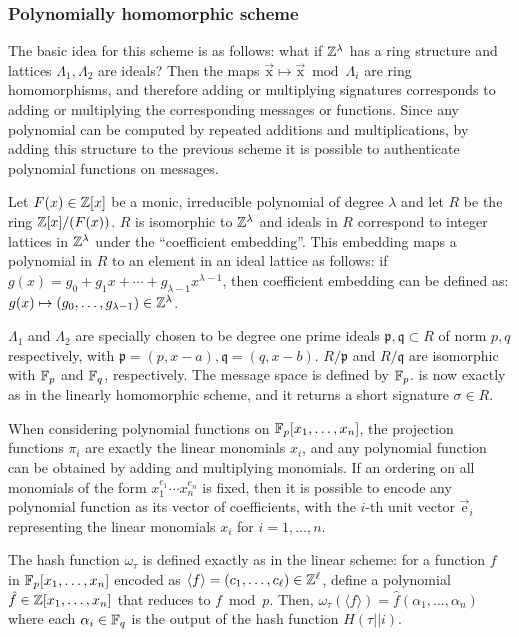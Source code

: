 \subsubsection*{Polynomially homomorphic scheme}
The basic idea for this scheme is as follows: what if $\mathbb{Z}^\lambda$ has a ring
structure and lattices $\Lambda_1, \Lambda_2$ are ideals? Then the maps
$\vec{\mathrm{x}} \mapsto \vec{\mathrm{x}} \bmod{\Lambda_i}$ are ring
homomorphisms, and therefore adding or multiplying signatures corresponds to
adding or multiplying the corresponding messages or functions. Since any
polynomial can be computed by repeated additions and multiplications, by adding
this structure to the previous scheme it is possible to authenticate polynomial
functions on messages.

Let $F(x) \in \mathbb{Z}[x]$ be a monic, irreducible polynomial of degree $\lambda$
and let $R$ be the ring $\mathbb{Z}[x]/(F(x))$. $R$ is isomorphic to $\mathbb{Z}^\lambda$
and ideals in $R$ correspond to integer lattices in $\mathbb{Z}^\lambda$ under the
``coefficient embedding''. This embedding maps a polynomial in $R$ to an
element in an ideal lattice as follows: if $g(x) = g_0 + g_1 x + \cdots
+ g_{\lambda-1} x^{\lambda - 1}$, then coefficient embedding can be defined as:
$g(x) \mapsto (g_0, \dotsc, g_{\lambda-1}) \in \mathbb{Z}^\lambda$.

$\Lambda_1$ and $\Lambda_2$ are specially chosen to be degree one prime ideals
$\mathfrak{p,q} \subset R$ of norm $p, q$ respectively, with $\mathfrak{p}
= (p, x - a), \mathfrak{q} = (q, x - b)$. $R/\mathfrak{p}$ and $R/\mathfrak{q}$
are isomorphic with $\mathbb{F}_p$ and $\mathbb{F}_q$, respectively. The message space is
defined by $\mathbb{F}_p$. \Sign is now exactly as in the linearly homomorphic
scheme, and it returns a short signature $\sigma \in R$.

When considering polynomial functions on $\mathbb{F}_p[x_1, \dotsc, x_n]$, the
projection functions $\pi_i$ are exactly the linear monomials $x_i$, and any
polynomial function can be obtained by adding and multiplying monomials.  If an
ordering on all monomials of the form $x_1^{e_1} \cdots x_n^{e_n}$ is fixed,
then it is possible to encode any polynomial function as its vector of
coefficients, with the $i$-th unit vector $\vec{\mathrm{e}}_i$ representing the
linear monomials $x_i$ for $i = 1, \dotsc, n$.

The hash function $\omega_\tau$ is defined exactly as in the linear scheme: for
a function $f$ in $\mathbb{F}_p[x_1, \dotsc, x_n]$ encoded as $\langle f \rangle
= (c_1, \dotsc, c_\ell) \in \mathbb{Z}^\ell$, define a polynomial $\hat{f} \in
\mathbb{Z}[x_1, \dotsc, x_n]$ that reduces to $f \bmod{p}$. Then,
$\omega_\tau(\langle f \rangle) = \hat{f}(\alpha_1, \dotsc, \alpha_n)$ where
each $\alpha_i \in \mathbb{F}_q$ is the output of the hash function $H(\tau || i)$.

